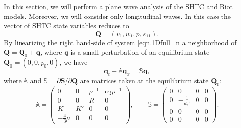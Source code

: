 \documentclass[3p,times,table]{article}
\newcommand{\pd}{\partial}
\newcommand{\QQ}{{\bm{Q}}}
\renewcommand{\SS}{{\bm{S}}}
\newcommand{\qq}{{\bm{q}}}
\begin{document}
In this section, we will perform a plane wave analysis of the SHTC and Biot 
models. Moreover, we will 
consider only longitudinal waves. In this case the vector of SHTC state 
variables reduces to 
\begin{equation}
\QQ = (v_1,w_1,p,s_{11}).
\end{equation}
By linearizing the right hand-side of system \eqref{eqn.1Dfull} in a 
neighborhood of $ \QQ = \QQ_0 + \qq $, where $ \qq 
$ is a small perturbation of an equilibrium state $ \QQ_0 = (0,0,p_0,0) $, we have
\begin{equation}\label{eqn.perturb}
\qq_t + \mathbb{A}\qq_x = \mathbb{S}\qq,
\end{equation}
where $ \mathbb{A} $ and $ \mathbb{S} = \pd\SS/\pd\QQ $ are matrices taken 
at the equilibrium state $ \QQ_0 $:
\begin{equation}\label{eqn.1d.matrices}
\mathbb{A} = \left( \begin{array}{cccc}
0 & 0 & \rho^{-1} & \alpha_{2}\rho^{-1} \\ 
0 & 0 & R & 0 \\ 
K & K' & 0 & 0 \\ 
-\frac43\mu & 0 & 0 & 0
\end{array} \right), \qquad
\mathbb{S} = \left( \begin{array}{cccc}
0 & 0 & 0 & 0 \\ 
0 & -\frac{1}{\theta_2'} & 0 & 0 \\ 
0 & 0 & 0 & 0 \\ 
0 & 0 & 0 & 0
\end{array} \right).
\end{equation}
\end{document}
